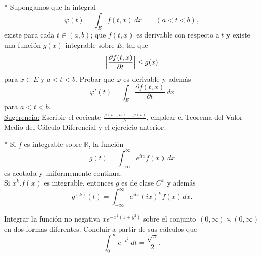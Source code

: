 \documentclass{book}
\newcommand{\rr}{\mathbb{R}}
\begin{document}
	\begin{ejer} {}*
   Supongamos que la integral 
   $$ \varphi(t)=\int_E f(t,x)\,dx\;\;\;\;\;\;\;(a<t<b),$$ 
   existe para cada $t\in (a,b)$; que $f(t,x)$ es derivable con respecto
   a $t$ y existe una función $g(x)$ integrable sobre $E$, tal que 
   $$\Bigl|\frac{\partial f(t,x)}{\partial t}\Bigr|\leq g(x)$$
   para $x \in E$ y $a<t<b$.
   Probar que $\varphi$ es derivable y además 
   $$\varphi'(t)=\int_E \frac{\partial f(t,x)}{\partial t}\,dx $$ para $a<t<b$.
	\\
   \underline{Sugerencia:} Escribir el cociente $\frac{\varphi(t+h)-\varphi(t)}{h}$, emplear el Teorema del Valor
   Medio del Cálculo Diferencial y el ejercicio anterior.
	\end{ejer}

\begin{ejer}{}*
 Si $f$ es integrable sobre $\rr$, la función 
  $$g(t)=\int_{-\infty}^{\infty} e^{i t x} f(x)\,dx $$
   es acotada y uniformemente continua.
   \\
   Si $x^k.f(x)$ es integrable, entonces $g$ es de clase $C^k$ y además 
   $$g^{(k)}(t)=\int_{-\infty}^{\infty} e^{i t x} (i x)^k  f(x)\,dx.$$
 \end{ejer}
   
   
 
  


\begin{ejer}{} 
Integrar la función no negativa $xe^{-x^2(1+y^2)}$ sobre el conjunto $(0,\infty)\times (0,\infty)$
en dos formas diferentes. Concluir a partir de sus cálculos que 
\[
\int_0^{\infty} e^{-t^2}\,dt=\frac{\sqrt{\pi}}{2}.
\]
\end{ejer}
\end{document}
